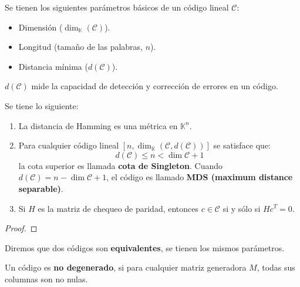 \documentclass[12pt]{report}
\newcounter{it}
\theoremstyle{largebreak}
\begin{document}
    Se tienen los siguientes parámetros básicos de un código lineal $\mathcal{C}$:
    \begin{itemize}
        \item Dimensión ($\dim_{\mathbb{K}}(\mathcal{C})$).
        \item Longitud (tamaño de las palabras, $n$).
        \item Distancia mínima ($d(\mathcal{C})$).
    \end{itemize}

    \begin{obs}
        $d(\mathcal{C})$ mide la capacidad de detección y corrección de errores en un código.
    \end{obs}

    \begin{propo}
        Se tiene lo siguiente:
        \begin{enumerate}[label = \textit{(\arabic*)}]
            \item La distancia de Hamming es una métrica en $\mathbb{K}^n$.
            \item Para cualquier código lineal $[n,\dim_{\mathbb{K}}(\mathcal{C},d(\mathcal{C}))]$ se satisface que:
            \begin{equation*}
                d(\mathcal{C})\leq n<\dim\mathcal{C}+1
            \end{equation*}
            la cota superior es llamada \textbf{cota de Singleton}. Cuando $d(\mathcal{C})=n-\dim\mathcal{C}+1$, el código es llamado \textbf{MDS (maximum distance separable)}.
            \item Si $H$ es la matriz de chequeo de paridad, entonces $c\in\mathcal{C}$ si y sólo si $Hc^T=0$.
        \end{enumerate}
    \end{propo}

    \begin{proof}
        
    \end{proof}

    \begin{mydef}
        Diremos que dos códigos son \textbf{equivalentes}, se tienen los mismos parámetros.
    \end{mydef}

    \begin{mydef}
        Un código es \textbf{no degenerado}, si para cualquier matriz generadora $M$, todas sus columnas son no nulas.
    \end{mydef}
\end{document}
